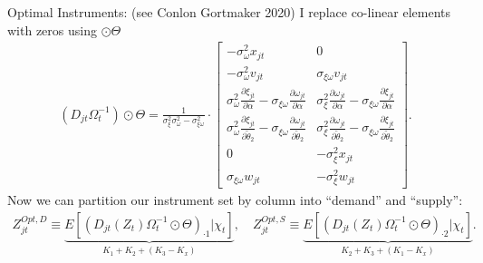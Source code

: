 \documentclass[xcolor=pdftex,dvipsnames,table,mathserif,aspectratio=169]{beamer}
\begin{document}
\begin{frame}{Optimal Instruments: (see Conlon Gortmaker 2020) }
\noindent I replace co-linear elements with zeros using $\odot \Theta$
\begin{align*}
    (D_{jt} \Omega_t^{-1} ) \odot \Theta =  \frac{1}{\sigma_\xi^2 \sigma_\omega^2 - \sigma_{\xi \omega}^2} \cdot 
    \begin{bmatrix}
        -\sigma_\omega^2 x_{jt} & 0  \\
        -\sigma_\omega^2 v_{jt} & \sigma_{\xi \omega} v_{jt} \\
        \sigma_\omega^2 \frac{\partial \xi_{jt}}{\partial \alpha} - 
        \sigma_{\xi\omega}\frac{\partial \omega_{jt}}{\partial \alpha} 
        & \sigma_{\xi}^2 \frac{\partial \omega_{jt}}{\partial \alpha}  - 
        \sigma_{\xi\omega}\frac{\partial \xi_{jt}}{\partial \alpha}  \\
        \sigma_\omega^2 \frac{\partial \xi_{jt}}{\partial \widetilde{\theta}_2}  -
        \sigma_{\xi\omega}\frac{\partial \omega_{jt}}{\partial \widetilde{\theta}_2} 
        & \sigma_{\xi}^2 \frac{\partial \omega_{jt}}{\partial \widetilde{\theta}_2} - 
        \sigma_{\xi\omega}\frac{\partial \xi_{jt}}{\partial \widetilde{\theta}_2}\\
        0 &  -\sigma_{\xi}^2 x_{jt} \\
        \sigma_{\xi\omega} w_{jt} & -\sigma_{\xi}^2 w_{jt}
    \end{bmatrix}
    .
\end{align*}
\noindent Now we can partition our instrument set by column into ``demand'' and ``supply'': 
\begin{align*}
    Z_{jt}^{\textit{Opt},D} \equiv \underbrace{E[(D_{jt}(Z_t) \Omega_t^{-1} \odot \Theta)_{\cdot 1} | \chi_t]}_{K_1 + K_2 + (K_3 - K_x)}, \quad Z_{jt}^{\textit{Opt},S} \equiv \underbrace{E[(D_{jt}(Z_t)\Omega_t^{-1} \odot \Theta)_{\cdot 2} | \chi_t]}_{K_2 + K_3+ (K_1 - K_x)}.
\end{align*}
\end{frame}
\end{document}
